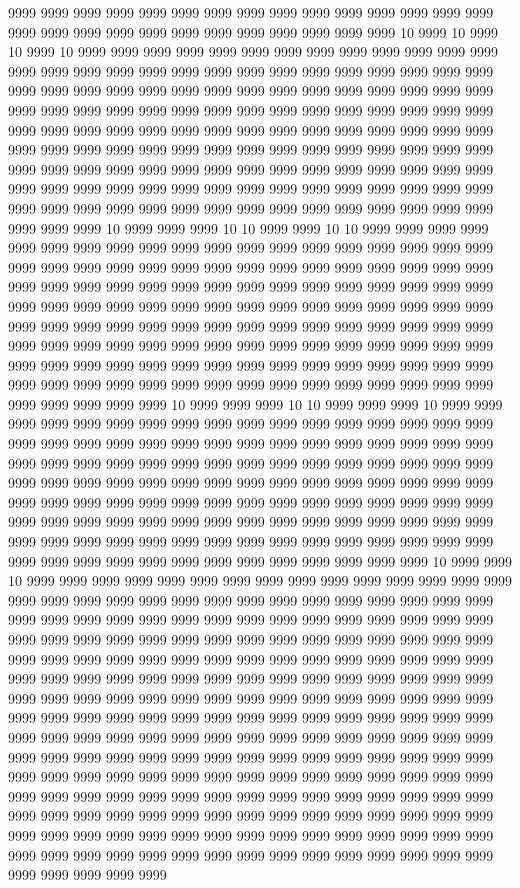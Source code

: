 9999 9999 9999 9999 9999 9999 9999 9999 9999 9999 9999 9999 9999 9999 9999 9999 9999 9999 9999 9999 9999 9999 9999 9999 9999 9999 9999 10 9999 10 9999 10 9999 10 9999 9999 9999 9999 9999 9999 9999 9999 9999 9999 9999 9999 9999 9999 9999 9999 9999 9999 9999 9999 9999 9999 9999 9999 9999 9999 9999 9999 9999 9999 9999 9999 9999 9999 9999 9999 9999 9999 9999 9999 9999 9999 9999 9999 9999 9999 9999 9999 9999 9999 9999 9999 9999 9999 9999 9999 9999 9999 9999 9999 9999 9999 9999 9999 9999 9999 9999 9999 9999 9999 9999 9999 9999 9999 9999 9999 9999 9999 9999 9999 9999 9999 9999 9999 9999 9999 9999 9999 9999 9999 9999 9999 9999 9999 9999 9999 9999 9999 9999 9999 9999 9999 9999 9999 9999 9999 9999 9999 9999 9999 9999 9999 9999 9999 9999 9999 9999 9999 9999 9999 9999 9999 9999 9999 9999 9999 9999 9999 9999 9999 9999 9999 9999 9999 9999 9999 10 9999 9999 9999 10 10 9999 9999 10 10 9999 9999 9999 9999 9999 9999 9999 9999 9999 9999 9999 9999 9999 9999 9999 9999 9999 9999 9999 9999 9999 9999 9999 9999 9999 9999 9999 9999 9999 9999 9999 9999 9999 9999 9999 9999 9999 9999 9999 9999 9999 9999 9999 9999 9999 9999 9999 9999 9999 9999 9999 9999 9999 9999 9999 9999 9999 9999 9999 9999 9999 9999 9999 9999 9999 9999 9999 9999 9999 9999 9999 9999 9999 9999 9999 9999 9999 9999 9999 9999 9999 9999 9999 9999 9999 9999 9999 9999 9999 9999 9999 9999 9999 9999 9999 9999 9999 9999 9999 9999 9999 9999 9999 9999 9999 9999 9999 9999 9999 9999 9999 9999 9999 9999 9999 9999 9999 9999 9999 9999 9999 9999 9999 9999 9999 9999 9999 9999 9999 10 9999 9999 9999 10 10 9999 9999 9999 10 9999 9999 9999 9999 9999 9999 9999 9999 9999 9999 9999 9999 9999 9999 9999 9999 9999 9999 9999 9999 9999 9999 9999 9999 9999 9999 9999 9999 9999 9999 9999 9999 9999 9999 9999 9999 9999 9999 9999 9999 9999 9999 9999 9999 9999 9999 9999 9999 9999 9999 9999 9999 9999 9999 9999 9999 9999 9999 9999 9999 9999 9999 9999 9999 9999 9999 9999 9999 9999 9999 9999 9999 9999 9999 9999 9999 9999 9999 9999 9999 9999 9999 9999 9999 9999 9999 9999 9999 9999 9999 9999 9999 9999 9999 9999 9999 9999 9999 9999 9999 9999 9999 9999 9999 9999 9999 9999 9999 9999 9999 9999 9999 9999 9999 9999 9999 9999 9999 9999 9999 10 9999 9999 10 9999 9999 9999 9999 9999 9999 9999 9999 9999 9999 9999 9999 9999 9999 9999 9999 9999 9999 9999 9999 9999 9999 9999 9999 9999 9999 9999 9999 9999 9999 9999 9999 9999 9999 9999 9999 9999 9999 9999 9999 9999 9999 9999 9999 9999 9999 9999 9999 9999 9999 9999 9999 9999 9999 9999 9999 9999 9999 9999 9999 9999 9999 9999 9999 9999 9999 9999 9999 9999 9999 9999 9999 9999 9999 9999 9999 9999 9999 9999 9999 9999 9999 9999 9999 9999 9999 9999 9999 9999 9999 9999 9999 9999 9999 9999 9999 9999 9999 9999 9999 9999 9999 9999 9999 9999 9999 9999 9999 9999 9999 9999 9999 9999 9999 9999 9999 9999 9999 9999 9999 9999 9999 9999 9999 9999 9999 9999 9999 9999 9999 9999 9999 9999 9999 9999 9999 9999 9999 9999 9999 9999 9999 9999 9999 9999 9999 9999 9999 9999 9999 9999 9999 9999 9999 9999 9999 9999 9999 9999 9999 9999 9999 9999 9999 9999 9999 9999 9999 9999 9999 9999 9999 9999 9999 9999 9999 9999 9999 9999 9999 9999 9999 9999 9999 9999 9999 9999 9999 9999 9999 9999 9999 9999 9999 9999 9999 9999 9999 9999 9999 9999 9999 9999 9999 9999 9999 9999 9999 9999 9999 9999 9999 9999 9999 9999 9999 9999 9999 9999 9999 9999 9999 9999 9999 9999 9999 9999 9999 9999 9999 